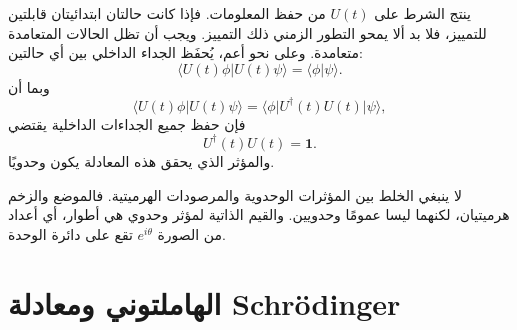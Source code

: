 ينتج الشرط على \(U(t)\) من حفظ المعلومات. فإذا كانت حالتان ابتدائيتان قابلتين للتمييز، فلا بد ألا يمحو التطور الزمني ذلك التمييز. ويجب أن تظل الحالات المتعامدة متعامدة. وعلى نحو أعم، يُحفَظ الجداء الداخلي بين أي حالتين:
\begin{equation}
\langle U(t)\phi|U(t)\psi\rangle
=\langle\phi|\psi\rangle.
\end{equation}
وبما أن
\begin{equation}
\langle U(t)\phi|U(t)\psi\rangle
=\langle\phi|U^\dagger(t)U(t)|\psi\rangle,
\end{equation}
فإن حفظ جميع الجداءات الداخلية يقتضي
\begin{equation}
U^\dagger(t)U(t)=\mathbf 1.
\end{equation}
والمؤثر الذي يحقق هذه المعادلة يكون وحدويًا.

\begin{classroomqa}
\end{classroomqa}


لا ينبغي الخلط بين المؤثرات الوحدوية والمرصودات الهرميتية. فالموضع والزخم هرميتيان، لكنهما ليسا عمومًا وحدويين. والقيم الذاتية لمؤثر وحدوي هي أطوار، أي أعداد من الصورة \(e^{i\theta}\) تقع على دائرة الوحدة.

\begin{classroomqa}
\end{classroomqa}

\section{الهاملتوني ومعادلة Schr\"odinger}

